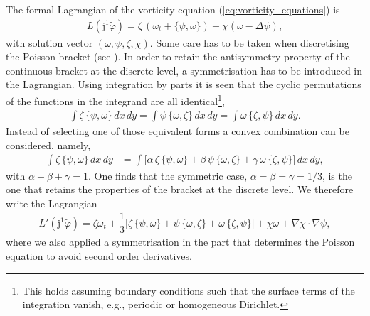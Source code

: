\documentclass[12pt,a4paper,reqno]{article}
\begin{document}
The formal Lagrangian of the vorticity equation (\ref{eq:vorticity_equations}) is
\begin{align}\label{eq:vorticity_lagrangian}
L ( {\ensuremath{\mathrm{j}}}^{1} \tilde{\ensuremath{\varphi}} ) = \zeta \, ( \omega_{\ensuremath{{\ensuremath{{t}}}}} + \{ \psi , \omega \} ) + \chi ( \omega - \Delta \psi ) ,
\end{align}
with solution vector $(\omega, \psi, \zeta, \chi)$.
Some care has to be taken when discretising the Poisson bracket (see \citeauthor{SalmonTalley:1989} \cite{SalmonTalley:1989}).
In order to retain the antisymmetry property of the continuous bracket at the discrete level, a symmetrisation has to be introduced in the Lagrangian.
Using integration by parts it is seen that the cyclic permutations of the functions in the integrand are all identical\footnote{
This holds assuming boundary conditions such that the surface terms of the integration vanish, e.g., periodic or homogeneous Dirichlet.
},
\begin{align}
  \int \zeta \, \{ \psi , \omega \} \, d{\ensuremath{{\ensuremath{{x}}}}} \, d{\ensuremath{{\ensuremath{{y}}}}}
= \int \psi \, \{ \omega , \zeta \} \, d{\ensuremath{{\ensuremath{{x}}}}} \, d{\ensuremath{{\ensuremath{{y}}}}}
= \int \omega \, \{ \zeta , \psi \} \, d{\ensuremath{{\ensuremath{{x}}}}} \, d{\ensuremath{{\ensuremath{{y}}}}} .
\end{align}
Instead of selecting one of those equivalent forms a convex combination can be considered, namely,
\begin{align}
\int \zeta \, \{ \psi , \omega \} \, d{\ensuremath{{\ensuremath{{x}}}}} \, d{\ensuremath{{\ensuremath{{y}}}}}
&= \int \Big[ \alpha \, \zeta \, \{ \psi , \omega \}
             + \beta \, \psi \, \{ \omega , \zeta \}
            + \gamma \, \omega \, \{ \zeta , \psi \} \Big] \, d{\ensuremath{{\ensuremath{{x}}}}} \, d{\ensuremath{{\ensuremath{{y}}}}} ,
\end{align}
with $\alpha + \beta + \gamma = 1$.
One finds that the symmetric case, $\alpha = \beta = \gamma = 1/3$, is the one that retains the properties of the bracket at the discrete level.
We therefore write the Lagrangian
\begin{align}\label{eq:vorticity_lagrangian_symmetrised}
L' ( {\ensuremath{\mathrm{j}}}^{1} \tilde{\ensuremath{\varphi}} ) = \zeta \omega_{\ensuremath{{\ensuremath{{t}}}}} + \dfrac{1}{3} \Big[ \zeta \, \{ \psi , \omega \} + \psi \, \{ \omega , \zeta \} + \omega \, \{ \zeta , \psi \} \Big] + \chi \omega + \nabla \chi \cdot \nabla \psi ,
\end{align}
where we also applied a symmetrisation in the part that determines the Poisson equation to avoid second order derivatives.
\end{document}
